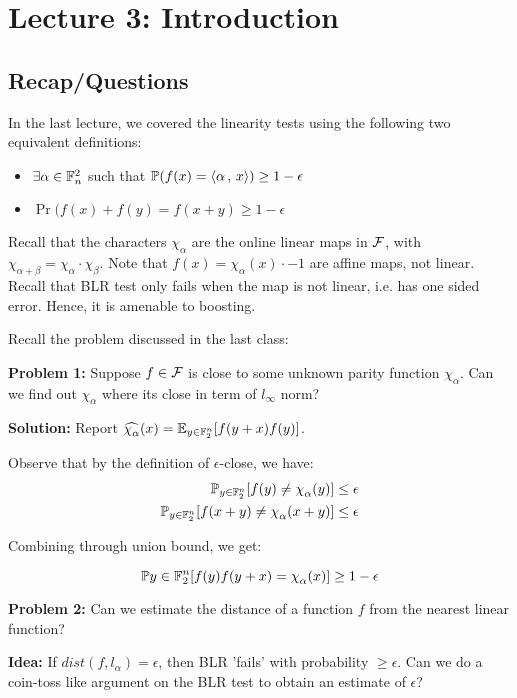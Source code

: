 \chapter{Lecture 3: Introduction}

\section{Recap/Questions}
In the last lecture, we covered the linearity tests using the following two equivalent definitions:
\begin{itemize}
    \item $\exists \alpha \in \mathbb{F}_n^2$ such that $\mathbb{P}(f(x) = \left\langle {\alpha} \,,\, {x} \right\rangle) \geq 1 - \epsilon$
    \item $\Pr(f(x)+f(y) = f(x+y) \geq 1 - \epsilon$
\end{itemize}

Recall that the characters $\chi_\alpha$ are the online linear maps in $\mathcal{F}$, with $\chi_{\alpha+\beta} = \chi_\alpha \cdot \chi_\beta$. Note that $f(x) = \chi_\alpha(x) \cdot -1$ are affine maps, not linear. Recall that BLR test only fails when the map is not linear, i.e. has one sided error. Hence, it is amenable to boosting.

Recall the problem discussed in the last class:

\textbf{Problem 1: } Suppose $f \in \mathcal{F}$ is close to some unknown parity function $\chi_\alpha$. Can we find out $\chi_\alpha$ where its close in term of $l_\infty$ norm?

\textbf{Solution:} Report $\widehat{\chi_\alpha}(x) = \E_{y \in \F_2^n}[f(y+x)f(y)]$. 

Observe that by the definition of $\epsilon$-close, we have:
\begin{align}
\Pr_{y \in \F_2^n}[f(y) \neq \chi_\alpha(y)] \leq \epsilon\\
\Pr_{y \in \F_2^n}[f(x+y) \neq \chi_\alpha(x+y)] \leq \epsilon
\end{align}

Combining through union bound, we get:

\[
\Pr{y \in \F_2^n}[f(y)f(y+x) = \chi_\alpha(x)] \geq 1 - \epsilon
\]

\textbf{Problem 2: } Can we estimate the distance of a function $f$ from the nearest linear function? 

\textbf{Idea: } If $dist(f,l_\alpha) = \epsilon$, then BLR 'fails' with probability $\geq \epsilon$. Can we do a coin-toss like argument on the BLR test to obtain an estimate of $\epsilon$?

